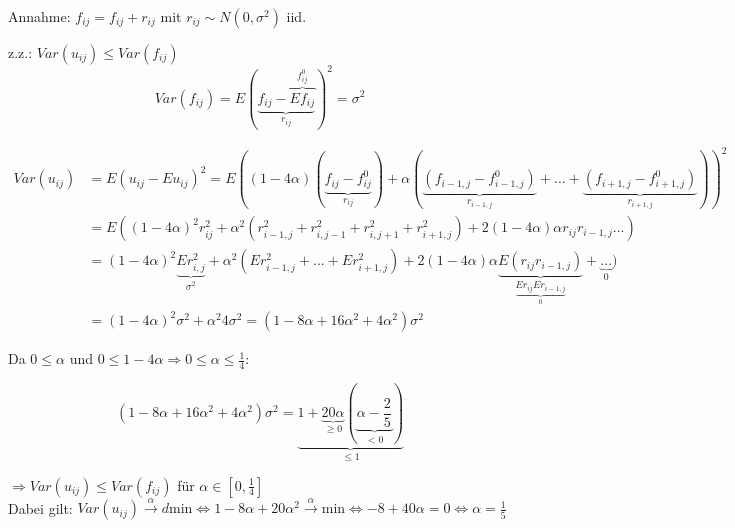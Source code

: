             Annahme: $f_{ij} = f_{ij} +r_{ij}$ mit $r_{ij} \sim N(0,\sigma^2)$ iid.
        
            z.z.: $Var(u_{ij}) \leq Var(f_{ij})$\\
            
            \begin{equation*}
                Var(f_{ij}) = E(\underbrace{f_{ij} - \overbrace{E f_{ij}}^{f^0_{ij}}}_{r_{ij}})^2 = \sigma^2
            \end{equation*}
        
            \begin{align*}
                Var(u_{ij}) &= E(u_{ij} - E u_{ij})^2 = E((1 - 4 \alpha) (\underbrace{f_{ij} - f^0_{ij}}_{r_{ij}}) + \alpha(\underbrace{(f_{i-1,j} - f^0_{i-1,j})}_{r_{i-1,j}} + ... + \underbrace{(f_{i+1,j} - f^0_{i+1,j})}_{r_{i+1,j}}))^2\\
                &= E((1 - 4 \alpha)^2 r_{ij}^2 + \alpha^2(r_{i-1,j}^2 + r_{i,j-1}^2 +r_{i,j+1}^2 + r_{i+1,j}^2) + 2 (1 - 4 \alpha) \alpha r_{ij} r_{i-1,j}...)\\%
                &= (1 - 4 \alpha)^2 \underbrace{E r_{i,j}^2}_{\sigma^2} + \alpha^2(E r_{i-1,j}^2 + ... + E r_{i+1,j}^2) + 2 (1 - 4 \alpha) \alpha \underbrace{E(r_{ij}r_{i-1,j})}_{\underbrace{E r_{ij} E r_{i-1,j}}_{0}} + \underbrace{...}_{0})\\
                &=(1 - 4 \alpha)^2 \sigma^2 + \alpha^2 4 \sigma^2 = (1 - 8 \alpha + 16 \alpha ^2 + 4 \alpha^2) \sigma^2
            \end{align*}
        
            Da $0 \leq \alpha$ und $ 0 \leq 1 - 4 \alpha \Rightarrow 0 \leq \alpha \leq \frac{1}{4}$:
        
            \begin{equation*}
                (1 - 8 \alpha + 16 \alpha ^2 + 4 \alpha^2) \sigma^2 = \underbrace{1 + \underbrace{20 \alpha}_{\geq 0} (\underbrace{\alpha - \frac{2}{5}}_{< 0})}_{\leq 1}
            \end{equation*}
        
            $\Rightarrow Var(u_{ij}) \leq Var(f_{ij})$ für $\alpha \in [0,\frac{1}{4}]$\\
            
            Dabei gilt: $Var(u_{ij}) \overset{\alpha}{\to} d \text{min} \iff 1 - 8 \alpha + 20 \alpha^2 \overset{\alpha}{\to} \text{min} \iff -8 + 40 \alpha = 0 \iff \alpha = \frac{1}{5}$
        
